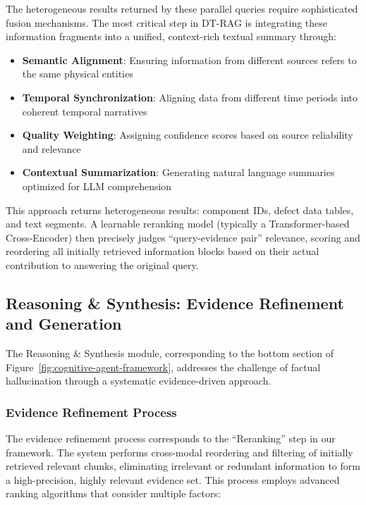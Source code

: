 The heterogeneous results returned by these parallel queries require sophisticated fusion mechanisms. The most critical step in DT-RAG is integrating these information fragments into a unified, context-rich textual summary through:

\begin{itemize}
\item \textbf{Semantic Alignment}: Ensuring information from different sources refers to the same physical entities
\item \textbf{Temporal Synchronization}: Aligning data from different time periods into coherent temporal narratives
\item \textbf{Quality Weighting}: Assigning confidence scores based on source reliability and relevance
\item \textbf{Contextual Summarization}: Generating natural language summaries optimized for LLM comprehension
\end{itemize}

This approach returns heterogeneous results: component IDs, defect data tables, and text segments. A learnable reranking model (typically a Transformer-based Cross-Encoder) then precisely judges ``query-evidence pair'' relevance, scoring and reordering all initially retrieved information blocks based on their actual contribution to answering the original query.

\subsection{Reasoning \& Synthesis: Evidence Refinement and Generation}

The Reasoning \& Synthesis module, corresponding to the bottom section of Figure~\ref{fig:cognitive-agent-framework}, addresses the challenge of factual hallucination through a systematic evidence-driven approach.

\subsubsection{Evidence Refinement Process}

The evidence refinement process corresponds to the ``Reranking'' step in our framework. The system performs cross-modal reordering and filtering of initially retrieved relevant chunks, eliminating irrelevant or redundant information to form a high-precision, highly relevant evidence set. This process employs advanced ranking algorithms that consider multiple factors:

